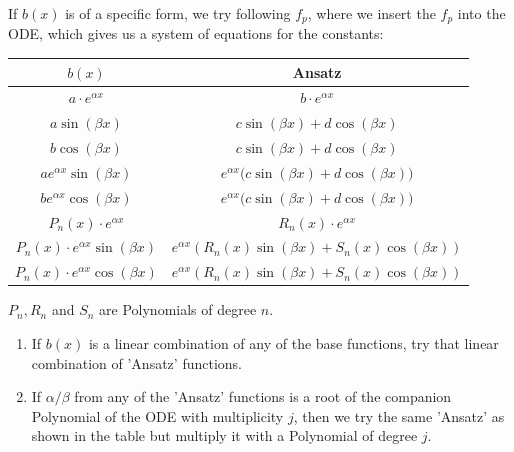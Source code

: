 \documentclass[a4paper,fontsize = 10pt]{article}
\begin{document}
If $b(x)$ is of a specific form, we try following $f_p$, where we insert the $f_p$ into the ODE, which gives us a system of equations for the constants:

\begin{center}
  \renewcommand*{\arraystretch}{1.6}
  \begin{tabular}{cc} 
    \toprule
    $b(x)$ & Ansatz \\ 
    \midrule
    $a \cdot e^{\alpha x}$ & $b \cdot e^{\alpha x}$\\
    $a \sin(\beta x)$ & $c \sin(\beta x) + d \cos(\beta x)$\\
    $b \cos(\beta x)$ & $c \sin(\beta x) + d \cos(\beta x)$\\
    $a e^{\alpha x} \sin(\beta x)$ & $e^{\alpha x} \Big( c \sin(\beta x) + d \cos(\beta x) \Big)$\\
    $b e^{\alpha x} \cos(\beta x)$ & $e^{\alpha x} \Big( c \sin(\beta x) + d \cos(\beta x) \Big)$\\
    $P_n(x) \cdot e^{\alpha x}$ & $R_n(x) \cdot e^{\alpha x}$\\
    $P_n(x) \cdot e^{\alpha x} \sin(\beta x)$ & $e^{\alpha x} \left( R_n(x) \sin(\beta x) + S_n(x) \cos(\beta x) \right)$\\
    $P_n(x) \cdot e^{\alpha x} \cos(\beta x)$ & $e^{\alpha x} \left( R_n(x) \sin(\beta x) + S_n(x) \cos(\beta x) \right)$\\
    \bottomrule
  \end{tabular}
\end{center}

\(P_n, R_n \) and \(S_n\) are Polynomials of degree $n$. 

\begin{enumerate}
  \item If \(b(x)\) is a linear combination of any of the base functions, try that linear combination of 'Ansatz' functions.  
  \item If $\alpha/\beta$ from any of the 'Ansatz' functions is a root of the companion Polynomial of the ODE with multiplicity $j$, then we try the same 'Ansatz' as shown in the table but multiply it with a Polynomial of degree $j$.
\end{enumerate}
\end{document}
